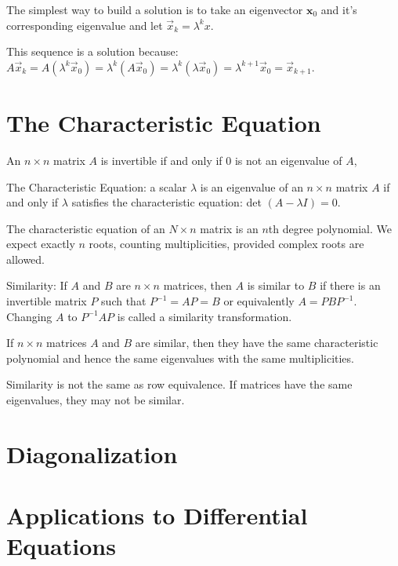 \documentclass[../linalg.tex]{subfiles}
\begin{document}
The simplest way to build a solution is to take an eigenvector $\textbf{x}_0$ and it's corresponding eigenvalue and let $\vec{x}_k=\lambda^k x$.

This sequence is a solution because: $A\vec{x}_k=A(\lambda^k\vec{x}_0)=\lambda^k(A\vec{x}_0)=\lambda^k(\lambda \vec{x}_0)=\lambda^{k+1}\vec{x}_0=\vec{x}_{k+1}$.


\section{The Characteristic Equation}
\begin{theorem}
    An $n\times n$ matrix $A$ is invertible if and only if 0 is not an eigenvalue of $A$,
\end{theorem}

The Characteristic Equation: a scalar $\lambda$ is an eigenvalue of an $n\times n$ matrix $A$ if and only if $\lambda$ satisfies the characteristic equation: det $(A-\lambda I)=0$.

The characteristic equation of an $N\times n$ matrix is an $n$th degree polynomial. We expect exactly $n$ roots, counting multiplicities, provided complex roots are allowed.

Similarity: If $A$ and $B$ are $n\times n$ matrices, then $A$ is similar to $B$ if there is an invertible matrix $P$ such that $P^{-1}=AP=B$ or equivalently $A=PBP^{-1}$. Changing $A$ to $P^{-1}AP$ is called a similarity transformation.

\begin{theorem}
    If $n\times n$ matrices $A$ and $B$ are similar, then they have the same characteristic polynomial and hence the same eigenvalues with the same multiplicities. 

    Similarity is not the same as row equivalence. If matrices have the same eigenvalues, they may not be similar.
\end{theorem}

\section{Diagonalization}
\section{Applications to Differential Equations}
\end{document}

